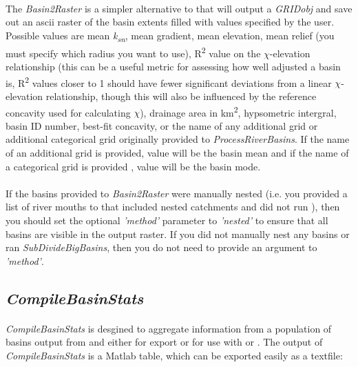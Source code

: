 \paragraph{}The \textit{Basin2Raster} is a simpler alternative to  that will output a \textit{GRIDobj} and save out an ascii raster of the basin extents filled with values specified by the user. Possible values are mean \textit{k\textsubscript{sn}}, mean gradient, mean elevation, mean relief (you must specify which radius you want to use), R\textsuperscript{2} value on the $\chi$-elevation relationship (this can be a useful metric for assessing how well adjusted a basin is, R\textsuperscript{2} values closer to 1 should have fewer significant deviations from a linear $\chi$-elevation relationship, though this will also be influenced by the reference concavity used for calculating $\chi$), drainage area in km\textsuperscript{2}, hypsometric intergral, basin ID number, best-fit concavity, or the name of any additional grid or additional categorical grid originally provided to \textit{ProcessRiverBasins}. If the name of an additional grid is provided, value will be the basin mean and if the name of a categorical grid is provided , value will be the basin mode. 

\paragraph{}If the basins provided to \textit{Basin2Raster} were manually nested (i.e. you provided a list of river mouths to  that included nested catchments and did not run ), then you should set the optional \textit{'method'} parameter to \textit{'nested'} to ensure that all basins are visible in the output raster. If you did not manually nest any basins or ran \textit{SubDivideBigBasins}, then you do not need to provide an argument to \textit{'method'}.

\subsection{\textit{CompileBasinStats}} \label{sec:CompStats}
\paragraph{}\textit{CompileBasinStats} is desgined to aggregate information from a population of basins output from  and  either for export or for use with  or . The output of \textit{CompileBasinStats} is a Matlab table, which can be exported easily as a textfile:

